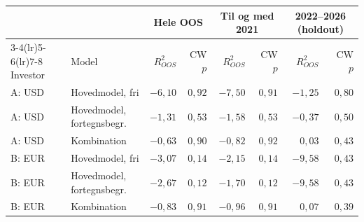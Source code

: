 \begin{tabular}{llrrrrrr}
\toprule
 & & \multicolumn{2}{c}{Hele OOS} & \multicolumn{2}{c}{Til og med 2021} & \multicolumn{2}{c}{2022--2026 (holdout)} \\
\cmidrule(lr){3-4}\cmidrule(lr){5-6}\cmidrule(lr){7-8}
Investor & Model & $R^2_{OOS}$ & CW $p$ & $R^2_{OOS}$ & CW $p$ & $R^2_{OOS}$ & CW $p$ \\
\midrule
A: USD & Hovedmodel, fri & $-6{,}10$ & $0{,}92$ & $-7{,}50$ & $0{,}91$ & $-1{,}25$ & $0{,}80$ \\
A: USD & Hovedmodel, fortegnsbegr. & $-1{,}31$ & $0{,}53$ & $-1{,}58$ & $0{,}53$ & $-0{,}37$ & $0{,}50$ \\
A: USD & Kombination & $-0{,}63$ & $0{,}90$ & $-0{,}82$ & $0{,}92$ & $0{,}03$ & $0{,}43$ \\
\midrule
B: EUR & Hovedmodel, fri & $-3{,}07$ & $0{,}14$ & $-2{,}15$ & $0{,}14$ & $-9{,}58$ & $0{,}43$ \\
B: EUR & Hovedmodel, fortegnsbegr. & $-2{,}67$ & $0{,}12$ & $-1{,}70$ & $0{,}12$ & $-9{,}58$ & $0{,}43$ \\
B: EUR & Kombination & $-0{,}83$ & $0{,}91$ & $-0{,}96$ & $0{,}91$ & $0{,}07$ & $0{,}39$ \\
\bottomrule
\end{tabular}
